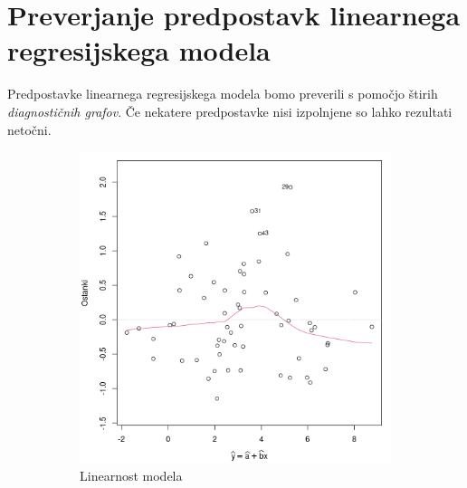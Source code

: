 \section{Preverjanje predpostavk linearnega regresijskega modela}\label{sec5}

Predpostavke linearnega regresijskega modela bomo preverili s pomočjo štirih \emph{diagnostičnih grafov}.
Če nekatere predpostavke nisi izpolnjene so lahko rezultati netočni.

\begin{figure}[!h]
    \centering
    \begin{subfigure}[ht]{0.49\textwidth}
        \includegraphics[width=\textwidth]{res/linearnost-modela.png}
        \caption{Linearnost modela}
        \label{img:linearnost-modela}
    \end{subfigure}
    \hfill
    \begin{subfigure}[ht]{0.49\textwidth}

\end{subfigure}
\end{figure}
